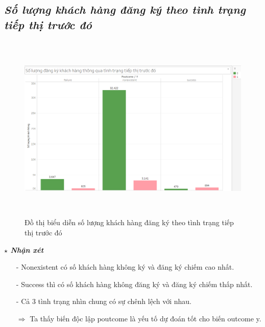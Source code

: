 \documentclass{report}
\begin{document}
\subsection{\textit{Số lượng khách hàng đăng ký theo tình trạng tiếp thị trước đó}}
         \begin{center}
        \begin{figure}[htp]
    	\begin{center}
    		\includegraphics[width=15cm, height=9cm]{images/hinh7.png}
    	\end{center}
    		\caption{Đồ thị biểu diễn số lượng khách hàng đăng ký theo tình trạng tiếp thị trước đó}
    \end{figure}
    \end{center}
    \fontsize{13}{14}\selectfont \textbf{$\star$\textit{ Nhận xét}}
    \begin{enumerate}
        \item[- ] Nonexistent có số khách hàng không ký và đăng ký chiếm cao nhất. 
        \item[- ] Success thì có số khách hàng không đăng ký và đăng ký chiếm thấp nhất.
        \item[- ] Cả 3 tình trạng nhìn chung có sự chênh lệch với nhau.
        \item [$\Rightarrow$] Ta thấy biến độc lập poutcome là yếu tố dự đoán tốt cho biến outcome y.
    \end{enumerate}
\pagebreak
\end{document}
